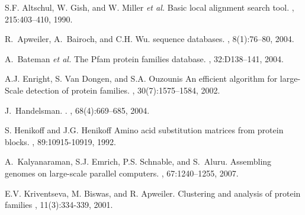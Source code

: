 \documentclass[10pt,journal,letterpaper,compsoc]{IEEEtran}
\begin{document}

%
%
%


\begin{thebibliography}{1}

S.F. Altschul, W. Gish, and W. Miller {\it et al.}
\newblock Basic local alignment search tool.
, 215:403--410, 1990.

R.~Apweiler, A.~Bairoch, and C.H. Wu.
 sequence databases.
, 8(1):76--80, 2004.


A.~Bateman {\it et al.}
\newblock The {Pfam} protein families database.
, 32:D138--141, 2004.


A.J. Enright, S. Van Dongen, and S.A. Ouzounis
\newblock An efficient algorithm for large-Scale detection of protein families.
, 30(7):1575--1584, 2002.


J.~Handelsman.
.
, 68(4):669--685, 2004.


S. Henikoff and J.G. Henikoff
\newblock Amino acid substitution matrices from protein blocks.
, 89:10915-10919, 1992.


A.~Kalyanaraman, S.J. Emrich, P.S. Schnable, and S.~Aluru.
\newblock Assembling genomes on large-scale parallel computers.
,
  67:1240--1255, 2007.

E.V. Kriventseva, M. Biswas, and R. Apweiler.
\newblock Clustering and analysis of protein families
, 11(3):334-339, 2001.



\end{thebibliography}
\end{document}
